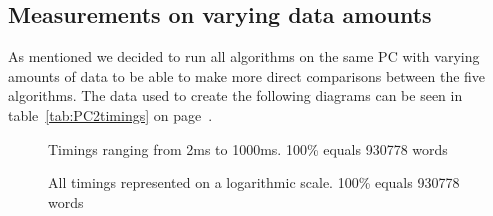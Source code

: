 \subsection{Measurements on varying data amounts}
\label{sec:4.2}
As mentioned we decided to run all algorithms on the same PC with varying amounts of data to be able to make more direct comparisons between the five algorithms. The data used to create the following diagrams can be seen in table~\ref{tab:PC2timings} on page~\pageref{tab:PC2timings}. 
\begin{figure}[H]
  \caption{Timings ranging from 2ms to 1000ms. 100\% equals 930778 words}
  \label{fig:pic2}
\end{figure}

\begin{figure}[H]
  \caption{All timings represented on a logarithmic scale. 100\% equals 930778 words}
  \label{fig:pic3}
\end{figure}

